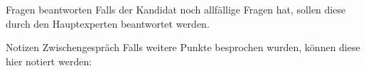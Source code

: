 \begin{taskitemwithoutcomment}{Fragen beantworten}
Falls der Kandidat noch allfällige Fragen hat, sollen diese durch den Hauptexperten beantwortet werden.
\end{taskitemwithoutcomment}

\begin{taskitem}{Notizen Zwischengespräch}
Falls weitere Punkte besprochen wurden, können diese hier notiert werden:
\end{taskitem}

\clearpage
